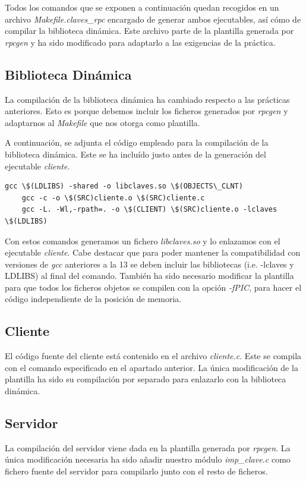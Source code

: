 \documentclass[]{article}
\begin{document}
Todos los comandos que se exponen a continuación quedan recogidos en un archivo \textit{Makefile.claves\_rpc} encargado de generar ambos ejecutables, así cómo de compilar la biblioteca dinámica. Este archivo parte de la plantilla generada por \textit{rpcgen} y ha sido modificado para adaptarlo a las exigencias de la práctica.  

\subsection{Biblioteca Dinámica}
\label{subsec:biblioteca}
La compilación de la biblioteca dinámica ha cambiado respecto a las prácticas anteriores. Esto es porque debemos incluir los ficheros generados por \textit{rpcgen} y adaptarnos al \textit{Makefile} que nos otorga como plantilla.

A continuación, se adjunta el código empleado para la compilación de la biblioteca dinámica. Este se ha incluído justo antes de la generación del ejecutable \textit{cliente}. 
\begin{center}
\begin{lstlisting}[caption=Compiación de biblioteca dinámica]
gcc \$(LDLIBS) -shared -o libclaves.so \$(OBJECTS\_CLNT)
	gcc -c -o \$(SRC)cliente.o \$(SRC)cliente.c
	gcc -L. -Wl,-rpath=. -o \$(CLIENT) \$(SRC)cliente.o -lclaves \$(LDLIBS)

\end{lstlisting}
\end{center}

Con estos comandos generamos un fichero \textit{libclaves.so} y lo enlazamos con el ejecutable \textit{cliente}. Cabe destacar que para poder mantener la compatibilidad con versiones de \textit{gcc} anteriores a la 13 se deben incluir las bibliotecas (i.e. -lclaves y LDLIBS) al final del comando. También ha sido necesario modificar la plantilla para que todos los ficheros objetos se compilen con la opción \textit{-fPIC}, para hacer el código independiente de la posición de memoria. 

\subsection{Cliente}
\label{subsec:cliente}
El código fuente del cliente está contenido en el archivo \textit{cliente.c}. Este se compila con el comando especificado en el apartado anterior. La única modificación de la plantilla ha sido su compilación por separado para enlazarlo con la biblioteca dinámica. 

\subsection{Servidor}
\label{subsec:compile_server}
La compilación del servidor viene dada en la plantilla generada por \textit{rpcgen}. La única modificación necesaria ha sido añadir nuestro módulo \textit{imp\_clave.c} como fichero fuente del servidor para compilarlo junto con el resto de ficheros. 
\end{document}
